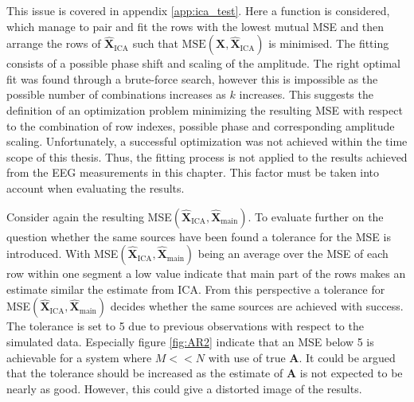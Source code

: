 This issue is covered in appendix \ref{app:ica_test}. 
Here a function is considered, which manage to pair and fit the rows with the lowest mutual MSE and then arrange the rows of $\hat{\mathbf{X}}_{\text{ICA}}$ such that $\text{MSE}(\mathbf{X}, \hat{\textbf{X}}_{\text{ICA}})$ is minimised. 
The fitting consists of a possible phase shift and scaling of the amplitude. 
The right optimal fit was found through a brute-force search, however this is impossible as the possible number of combinations increases as $k$ increases. 
This suggests the definition of an optimization problem minimizing the resulting MSE with respect to the combination of row indexes, possible phase and corresponding amplitude scaling. 
Unfortunately, a successful optimization was not achieved within the time scope of this thesis.
Thus, the fitting process is not applied to the results achieved from the EEG measurements in this chapter. 
This factor must be taken into account when evaluating the results.

Consider again the resulting MSE$(\hat{\mathbf{X}}_{\text{ICA}}, \hat{\mathbf{X}}_{\text{main}})$. 
To evaluate further on the question whether the same sources have been found a tolerance for the MSE is introduced. 
With MSE$(\hat{\mathbf{X}}_{\text{ICA}}, \hat{\mathbf{X}}_{\text{main}})$ being an average over the MSE of each row within one segment a low value indicate that main part of the rows makes an estimate similar the estimate from ICA. 
From this perspective a tolerance for MSE$(\hat{\mathbf{X}}_{\text{ICA}}, \hat{\mathbf{X}}_{\text{main}})$ decides whether the same sources are achieved with success. 
The tolerance is set to 5 due to previous observations with respect to the simulated data. Especially figure \ref{fig:AR2} indicate that an MSE below 5 is achievable for a system where $M << N$ with use of true $\mathbf{A}$. 
It could be argued that the tolerance should be increased as the estimate of $\mathbf{A}$ is not expected to be nearly as good. 
However, this could give a distorted image of the results.    

